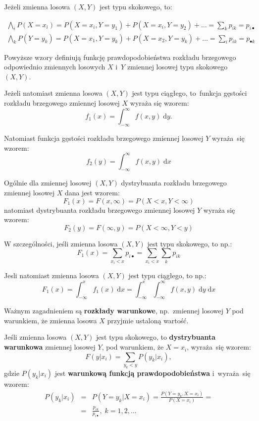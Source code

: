 \documentclass[10pt,a4paper]{article}
\newcommand{\dd}{\; \mathrm{d}}
\numberwithin{equation}{subsection}
\begin{document}
Jeżeli zmienna losowa $(X,Y)$ jest typu skokowego, to:

\begin{eqnarray}
  \bigwedge_i P(X = x_i) = P(X = x_i, Y = y_1) + P(X = x_i, Y = y_2) + \dotsc =
    \sum_kp_{ik} = p_{i\bullet} \\
  \bigwedge_k P(Y = y_k) = P(X = x_1, Y = y_k) + P(X = x_2, Y = y_k) + \dotsc =
    \sum_i p_{ik} = p_{\bullet k}
\end{eqnarray}

Powyższe wzory definiują funkcję prawdopodobieństwa rozkładu brzegowego
odpowiednio zmiennych losowych $X$ i~$Y$ zmiennej losowej typu skokowego $(X,Y)$.

Jeżeli natomiast zmienna losowa $(X,Y)$ jest typu ciągłego, to~funkcja gęstości
rozkładu brzegowego zmiennej losowej $X$ wyraża się wzorem:
\[
  f_1(x) = \int_{-\infty}^{\infty} f(x, y) \dd{y}.
\]

Natomiast funkcja gęstości rozkładu brzegowego zmiennej losowej $Y$ wyraża~się
wzorem:
\[
  f_2(y) = \int_{-\infty}^{\infty} f(x, y) \dd{x}
\]

Ogólnie dla zmiennej losowej $(X,Y)$ dystrybuanta rozkładu brzegowego zmiennej
losowej $X$ dana jest wzorem:
\[
  F_1(x) = F(x, \infty) = P(X < x, Y < \infty)
\]
natomiast dystrybuanta rozkładu brzegowego zmiennej losowej $Y$ wyraża się
wzorem:
\[
  F_2(y) = F(\infty, y) = P(X < \infty, Y < y)
\]

W szczególności, jeśli zmienna losowa $(X,Y)$ jest typu skokowego, to np.:
\[
  F_1(x) = \sum_{x_i<x} p_{i\bullet} = \sum_{x_i<x} \sum_k p_{ik}
\]

Jesli natomiast zmienna losowa $(X,Y)$ jest typu ciągłego, to np.:
\[
  F_1(x) = \int_{-\infty}^x f_1(x) \dd{x} = \int_{-\infty}^x \int_{-\infty}^{\infty} f(x,y) \dd{y}\dd{x}
\]

Ważnym zagadnieniem są \textbf{rozkłady warunkowe}, np.~zmiennej losowej $Y$
pod warunkiem, że zmienna losowa $X$ przyjmie ustaloną wartość.

Jeśli zmienna losowa $(X,Y)$ jest typu skokowego, to \textbf{dystrybuanta
  warunkowa} zmiennej losowej $Y$, pod warunkiem, że $X=x_i$, wyraża~się wzorem:
\begin{equation}
  F(y|x_i) = \sum_{y_k < y} P(y_k|x_i),
\end{equation}
gdzie $P(y_k|x_i)$ jest \textbf{warunkową funkcją prawdopodobieństwa}
i~wyraża~się wzorem:
\begin{eqnarray}
  P(y_k|x_i) &=& P(Y = y_k|X = x_i) = \frac{P(Y = y_k,X = x_i)}{P(X = x_i)} = \\
  \nonumber
  &=& \frac{p_{ik}}{p_{i\bullet}},\;k=1,2,\dotsc
\end{eqnarray}
\end{document}
